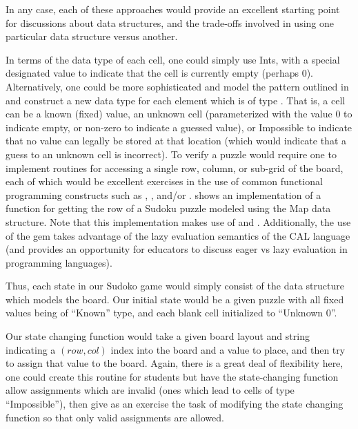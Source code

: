 In any case, each of these approaches would provide an excellent starting point for discussions about data structures, and the trade-offs involved in using one particular data structure versus another.


In terms of the data type of each cell, one could simply use Ints, with a special designated value to indicate that the cell is currently empty (perhaps 0).  Alternatively, one could be more sophisticated and model the pattern outlined in \cite{sudokuHaskell} and construct a new data type for each element which is of type .  That is, a cell can be a known (fixed) value, an unknown cell (parameterized with the value 0 to indicate empty, or non-zero to indicate a guessed value), or Impossible to indicate that no value can legally be stored at that location (which would indicate that a guess to an unknown cell is incorrect).  To verify a puzzle would require one to implement routines for accessing a single row, column, or sub-grid of the board, each of which would be excellent exercises in the use of common functional programming constructs such as , , and/or .  shows an implementation of a function for getting the row of a Sudoku puzzle modeled using the Map data structure.  Note that this implementation makes use of  and .  Additionally, the use of the  gem takes advantage of the lazy evaluation semantics of the CAL language (and provides an opportunity for educators to discuss eager vs lazy evaluation in programming languages).

Thus, each state in our Sudoko game would simply consist of the data structure which models the board.  Our initial state would be a given puzzle with all fixed values being of ``Known'' type, and each blank cell initialized to ``Unknown 0''.

Our state changing function would take a given board layout and string indicating a $(row,col)$ index into the board and a value to place, and then try to assign that value to the board.  Again, there is a great deal of flexibility here, one could create this routine for students but have the state-changing function allow assignments which are invalid (\ie ones which lead to cells of type ``Impossible''), then give as an exercise the task of modifying the state changing function so that only valid assignments are allowed.

